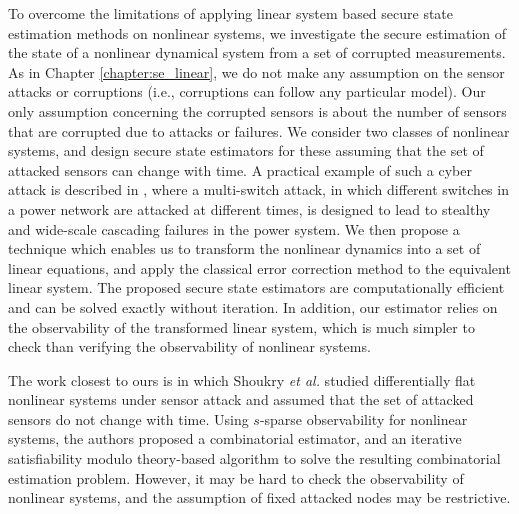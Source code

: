 \documentclass[../thesis.tex]{subfiles}
\begin{document}
To overcome the limitations of applying linear system based secure state estimation methods on nonlinear systems, we investigate the secure estimation of the state of a nonlinear dynamical system from a set of corrupted measurements. 
As in Chapter \ref{chapter:se_linear}, we do not make any assumption on the sensor attacks or corruptions (i.e., corruptions can follow any particular model). Our only assumption concerning the corrupted sensors is about the number of sensors that are corrupted due to attacks or failures. We consider two classes of nonlinear systems, and design secure state estimators for these assuming that the set of attacked sensors can change with time. A practical example of such a cyber attack is described in \cite{liu2014coordinated}, where a multi-switch attack, in which different switches in a power network are attacked at different times, is designed to lead to stealthy and wide-scale cascading failures in the power system.
We then propose a technique which enables us to transform the nonlinear dynamics into a set of linear equations, and apply the classical error correction method to the equivalent linear system. The proposed secure state estimators are computationally efficient and can be solved exactly without iteration. In addition, our estimator relies on the observability of the transformed linear system, which is much simpler to check than verifying the observability of nonlinear systems.


The work closest to ours is \cite{shoukry} in which Shoukry \textit{et al.} studied differentially flat nonlinear systems under sensor attack and assumed that the set of attacked sensors do not change with time. Using $s$-sparse observability for nonlinear systems, the authors proposed a combinatorial estimator, and an iterative satisfiability modulo theory-based algorithm to solve the resulting combinatorial estimation problem. However, it may be hard to check the observability of nonlinear systems, and the assumption of fixed attacked nodes may be restrictive.
\end{document}
